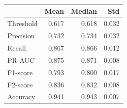 \begin{tabular}{lrrr}
\toprule
 & Mean & Median & Std \\
\midrule
Threshold & 0.617 & 0.618 & 0.032 \\
Precision & 0.732 & 0.734 & 0.032 \\
Recall & 0.867 & 0.866 & 0.012 \\
PR AUC & 0.875 & 0.871 & 0.008 \\
F1-score & 0.793 & 0.800 & 0.017 \\
F2-score & 0.836 & 0.832 & 0.008 \\
Accuracy & 0.941 & 0.943 & 0.007 \\
\bottomrule
\end{tabular}
